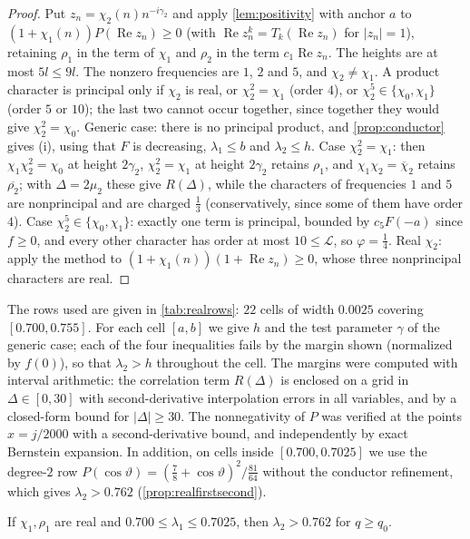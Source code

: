 \documentclass[11pt]{amsart}
\numberwithin{equation}{section}
\theoremstyle{plain}
\theoremstyle{definition}
\theoremstyle{remark}
\newcommand{\LL}{\mathcal{L}}
\renewcommand{\Re}{\operatorname{Re}}
\newcommand{\1}{\mathbf{1}}
\newcommand{\bchi}{\overline{\chi}}
\begin{document}
\begin{proof}
Put $z_n=\chi_2(n)n^{-i\gamma_2}$ and apply \cref{lem:positivity} with anchor $a$ to
$(1+\chi_1(n))P(\Re z_n)\ge0$ (with $\Re z_n^k=T_k(\Re z_n)$ for $|z_n|=1$), retaining $\rho_1$ in the term of $\chi_1$
and $\rho_2$ in the term $c_1\Re z_n$. The heights are at most $5l\le9l$. The nonzero frequencies are
$1$, $2$ and $5$, and $\chi_2\ne\chi_1$. A product character is principal only if $\chi_2$ is real, or
$\chi_2^2=\chi_1$ (order $4$), or $\chi_2^5\in\{\chi_0,\chi_1\}$ (order $5$ or $10$); the last two cannot
occur together, since together they would give $\chi_2^2=\chi_0$. Generic case: there is no principal
product, and \cref{prop:conductor} gives (i), using that $F$ is decreasing, $\lambda_1\le b$ and $\lambda_2\le h$.
Case $\chi_2^2=\chi_1$: then $\chi_1\chi_2^2=\chi_0$ at height $2\gamma_2$, $\chi_2^2=\chi_1$ at height $2\gamma_2$
retains $\rho_1$, and $\chi_1\chi_2=\bchi_2$ retains $\overline{\rho_2}$; with $\Delta=2\mu_2$ these give $R(\Delta)$,
while the characters of frequencies $1$ and $5$ are nonprincipal and are charged $\frac13$ (conservatively,
since some of them have order $4$). Case
$\chi_2^5\in\{\chi_0,\chi_1\}$: exactly one term is principal, bounded by $c_5F(-a)$ since $f\ge0$, and
every other character has order at most $10\le\LL$, so $\varphi=\frac14$. Real $\chi_2$: apply the
method to $(1+\chi_1(n))(1+\Re z_n)\ge0$, whose three nonprincipal characters are real.
\end{proof}

The rows used are given in \cref{tab:realrows}: $22$ cells of width $0.0025$ covering $[0.700,0.755]$.
For each cell $[a,b]$ we give $h$ and the test parameter $\gamma$ of the generic case; each of the four
inequalities fails by the margin shown (normalized by $f(0)$), so that $\lambda_2>h$ throughout the
cell. The margins were computed with interval arithmetic: the correlation term $R(\Delta)$ is enclosed
on a grid in $\Delta\in[0,30]$ with second-derivative interpolation errors in all variables, and by a
closed-form bound for $|\Delta|\ge30$. The nonnegativity of $P$ was verified at the points
$x=j/2000$ with a second-derivative bound, and independently by exact Bernstein expansion. In
addition, on cells inside $[0.700,0.7025]$ we use the degree-$2$ row
$P(\cos\vartheta)=(\frac78+\cos\vartheta)^2/\frac{81}{64}$ without the conductor refinement, which gives
$\lambda_2>0.762$ (\cref{prop:realfirstsecond}).

\begin{proposition}\label{prop:realfirstsecond}
If $\chi_1,\rho_1$ are real and $0.700\le\lambda_1\le0.7025$, then $\lambda_2>0.762$ for $q\ge q_0$.
\end{proposition}
\end{document}
